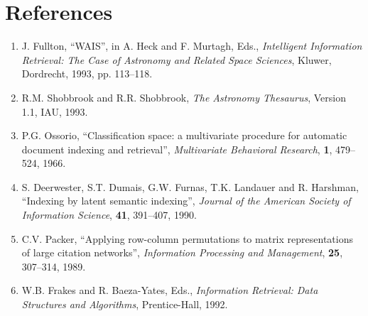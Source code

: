 \section*{References}

\begin{enumerate}

\item J. Fullton, ``WAIS'', in A. Heck and F. Murtagh, Eds., {\it Intelligent
Information Retrieval: The Case of Astronomy and Related Space Sciences},
Kluwer, Dordrecht, 1993, pp. 113--118.

\item R.M. Shobbrook and R.R. Shobbrook, {\it The Astronomy Thesaurus}, Version
1.1, IAU, 1993.

\item P.G. Ossorio, ``Classification space: a multivariate procedure for
automatic document indexing and retrieval'', {\it Multivariate Behavioral
Research}, {\bf 1}, 479--524, 1966.

\item 
S. Deerwester, S.T. Dumais, G.W. Furnas, T.K. Landauer and R. Harshman,
``Indexing by latent semantic indexing'', {\it Journal of the American 
Society of Information Science}, {\bf 41}, 391--407, 1990.

\item C.V. Packer, ``Applying row-column permutations to matrix 
representations of large citation networks'', {\it Information Processing and
Management}, {\bf 25}, 307--314, 1989.

\item W.B. Frakes and R. Baeza-Yates, Eds., {\it Information Retrieval: Data 
Structures and Algorithms}, Prentice-Hall, 1992.

\end{enumerate}





\bye

